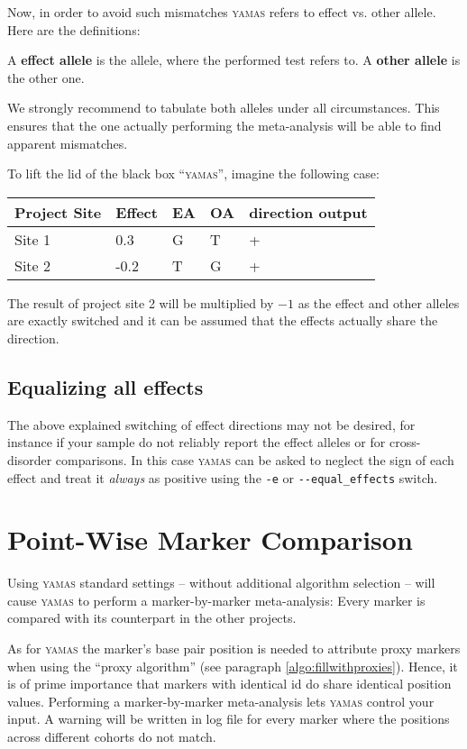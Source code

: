 Now, in order to avoid such mismatches \textsc{yamas} refers to effect vs. other allele. Here are the definitions:

A \textbf{effect allele} is the allele, where the performed test refers to.
A \textbf{other allele} is the other one.

\alert{We strongly recommend to tabulate both alleles under all circumstances. This ensures that the one actually performing the meta-analysis will be able to find apparent mismatches.} \newline 

To lift the lid of the black box ``\textsc{yamas}'', imagine the following case:
\begin{center}
\begin{tabular}{lllll}
\rowcolor{light-gray}Project Site & Effect & EA & OA & direction output\\\hline
Site 1 & 0.3 & G & T & +\\
Site 2 & -0.2 & T & G & +\\
\end{tabular}
\end{center}
The result of project site 2 will be multiplied by $-1$ as the effect and other alleles are exactly switched and it can be assumed that the effects actually share the direction.

\subsection{Equalizing all effects}
\label{algo:equal}

The above explained switching of effect directions may not be desired, for instance if your sample do not reliably report the effect alleles or for cross-disorder comparisons. In this case \textsc{yamas} can be asked to neglect the sign of each effect and treat it \textit{always} as positive using the \verb+-e+ or \verb+--equal_effects+ switch.

\section{Point-Wise Marker Comparison}
\label{algo:pointwise}

Using \textsc{yamas} standard settings -- without additional algorithm selection -- will cause \textsc{yamas} to perform a marker-by-marker meta-analysis: Every marker is compared with its counterpart in the other projects. 

\alert{As for \textsc{yamas} the marker's base pair position is needed to attribute proxy markers when using the ``proxy algorithm'' (see paragraph \ref{algo:fillwithproxies}). Hence, it is of prime importance that markers with identical id do share identical position values. Performing a marker-by-marker meta-analysis lets \textsc{yamas} control your input. A warning will be written in log file for every marker where the positions across different cohorts do not match.}

